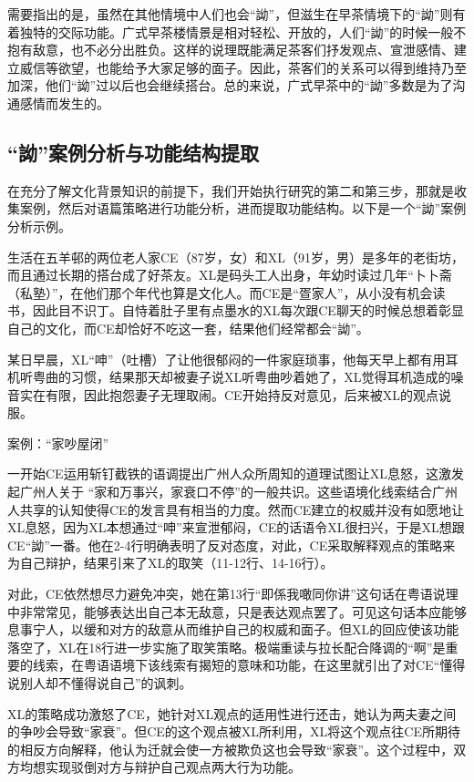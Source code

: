 \documentclass[b5paper,10.5pt,onecolumn,twoside,leqno,UTF8]{article}
\begin{document}
需要指出的是，虽然在其他情境中人们也会“詏”，但滋生在早茶情境下的“詏”则有着独特的交际功能。广式早茶楼情景是相对轻松、开放的，人们“詏”的时候一般不抱有敌意，也不必分出胜负。这样的说理既能满足茶客们抒发观点、宣泄感情、建立威信等欲望，也能给予大家足够的面子。因此，茶客们的关系可以得到维持乃至加深，他们“詏”过以后也会继续搭台。总的来说，广式早茶中的“詏”多数是为了沟通感情而发生的。

\subsection{“詏”案例分析与功能结构提取}
在充分了解文化背景知识的前提下，我们开始执行研究的第二和第三步，那就是收集案例，然后对语篇策略进行功能分析，进而提取功能结构。以下是一个“詏”案例分析示例。

生活在五羊邨的两位老人家CE（87岁，女）和XL（91岁，男）是多年的老街坊，而且通过长期的搭台成了好茶友。XL是码头工人出身，年幼时读过几年“卜卜斋（私塾）”，在他们那个年代也算是文化人。而CE是“疍家人”，从小没有机会读书，因此目不识丁。自恃着肚子里有点墨水的XL每次跟CE聊天的时候总想着彰显自己的文化，而CE却恰好不吃这一套，结果他们经常都会“詏”。

某日早晨，XL“呻”（吐槽）了让他很郁闷的一件家庭琐事，他每天早上都有用耳机听粤曲的习惯，结果那天却被妻子说XL听粤曲吵着她了，XL觉得耳机造成的噪音实在有限，因此抱怨妻子无理取闹。CE开始持反对意见，后来被XL的观点说服。

\begin{table}[h!]
\caption{案例：“家吵屋闭”}

\end{table}

一开始CE运用斩钉截铁的语调提出广州人众所周知的道理试图让XL息怒，这激发起广州人关于 “家和万事兴，家衰口不停”的一般共识。这些语境化线索结合广州人共享的认知使得CE的发言具有相当的力度。然而CE建立的权威并没有如愿地让XL息怒，因为XL本想通过“呻”来宣泄郁闷，CE的话语令XL很扫兴，于是XL想跟CE“詏”一番。他在2-4行明确表明了反对态度，对此，CE采取解释观点的策略来为自己辩护，结果引来了XL的取笑（11-12行、14-16行）。

对此，CE依然想尽力避免冲突，她在第13行“即係我噉同你讲”这句话在粤语说理中非常常见，能够表达出自己本无敌意，只是表达观点罢了。可见这句话本应能够息事宁人，以缓和对方的敌意从而维护自己的权威和面子。但XL的回应使该功能落空了，XL在18行进一步实施了取笑策略。极端重读与拉长配合降调的“啊”是重要的线索，在粤语语境下该线索有揭短的意味和功能，在这里就引出了对CE“懂得说别人却不懂得说自己”的讽刺。

XL的策略成功激怒了CE，她针对XL观点的适用性进行还击，她认为两夫妻之间的争吵会导致“家衰”。但CE的这个观点被XL所利用，XL将这个观点往CE所期待的相反方向解释，他认为迁就会使一方被欺负这也会导致“家衰”。这个过程中，双方均想实现驳倒对方与辩护自己观点两大行为功能。
\end{document}
